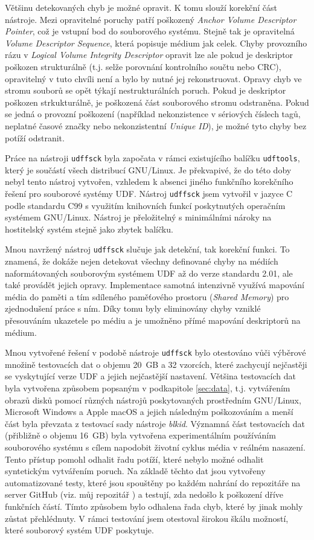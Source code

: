 Většinu detekovaných chyb je možné opravit. K tomu slouží korekční část nástroje. Mezi opravitelné poruchy patří poškozený \textit{Anchor Volume Descriptor Pointer}, což je vstupní bod do souborového systému. Stejně tak je opravitelná \textit{Volume Descriptor Sequence}, která popisuje médium jak celek. Chyby provozního rázu v \textit{Logical Volume Integrity Descriptor} opravit lze ale pokud je deskriptor poškozen strukturálně (t.j. selže porovnání kontrolního součtu nebo CRC), opravitelný v tuto chvíli není a bylo by nutné jej rekonstruovat. Opravy chyb ve stromu souborů se opět týkají nestrukturálních poruch. Pokud je deskriptor poškozen strkukturálně, je poškozená část souborového stromu odstraněna. Pokud se jedná o provozní poškození (například nekonzistence v sériových číslech tagů, neplatné časové značky nebo nekonzistentní \textit{Unique ID}), je možné tyto chyby bez potíží odstranit.

Práce na nástroji \texttt{udffsck} byla započata v rámci existujícího balíčku \texttt{udftools}, který je součástí všech distribucí GNU/Linux. Je překvapivé, že do této doby nebyl tento nástroj vytvořen, vzhledem k absenci jiného funkčního korekčního řešení pro souborové systémy UDF. Nástroj \texttt{udffsck} jsem vytvořil v jazyce C podle standardu C99 s využitím knihovních funkcí poskytnutých operačním systémem \mbox{GNU/Linux}. Nástroj je přeložitelný s minimálními nároky na hostitelský systém stejně jako zbytek balíčku. 

Mnou navržený nástroj \texttt{udffsck} slučuje jak detekční, tak korekční funkci. To znamená, že dokáže nejen detekovat všechny definované chyby na médiích naformátovaných souborovým systémem UDF až do verze standardu 2.01, ale také provádět jejich opravy. Implementace samotná intenzivně využívá mapování média do paměti a tím sdíleného paměťového prostoru (\textit{Shared Memory}) pro zjednodušení práce s ním. Díky tomu byly eliminovány chyby vzniklé přesouváním ukazetele po médiu a je umožněno přímé mapování deskriptorů na médium.

Mnou vytvořené řešení v podobě nástroje \texttt{udffsck} bylo otestováno vůči výběrové množině testovacích dat o objemu 20~GB a 32 vzorcích, které zachycují nejčastěji se vyskytující verze UDF a jejich nejčastější nastavení. Většina testovacích dat byla vytvořena způsobem popsaným v podkapitole \ref{sec:data}, t.j. vytvářením obrazů disků pomocí různých nástrojů poskytovaných prostředním \mbox{GNU/Linux}, Microsoft Windows a Apple macOS a jejich následným poškozováním a menší část byla převzata z testovací sady nástroje \textit{blkid}. Významná část testovacích dat (přibližně o objemu 16~GB) byla vytvořena experimentálním používáním souborového systému s cílem napodobit životní cyklus média v reálném nasazení. Tento přístup pomohl odhalit řadu potíží, které nebylo možné odhalit syntetickým vytvářením poruch. Na základě těchto dat jsou vytvořeny automatizované testy, které jsou spouštěny po každém nahrání do repozitáře na server GitHub (viz. můj repozitář \cite{udftools-github-moje}) a testují, zda nedošlo k poškození dříve funkčních částí. Tímto způsobem bylo odhalena řada chyb, které by jinak mohly zůstat přehlédnuty. V rámci testování jsem otestoval širokou škálu možností, které souborový systém UDF poskytuje.

